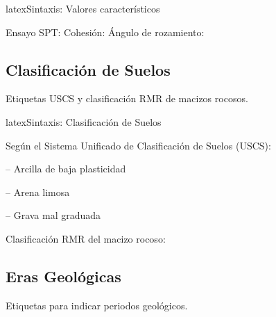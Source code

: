\begin{geotechdata}
\end{geotechdata}


\begin{codigosimple}{latex}{Sintaxis: Valores característicos}
      
\end{codigosimple}

\vspace{0.5em}
\noindent
Ensayo SPT:  \quad
Cohesión:  \quad
Ángulo de rozamiento: 

\subsection{Clasificación de Suelos}
\label{subsec:clasificacion-suelos}

Etiquetas USCS y clasificación RMR de macizos rocosos.

\begin{codigosimple}{latex}{Sintaxis: Clasificación de Suelos}
\end{codigosimple}

\noindent
Según el Sistema Unificado de Clasificación de Suelos (USCS):

\noindent
{} -- Arcilla de baja plasticidad

\noindent
{} -- Arena limosa

\noindent
{} -- Grava mal graduada

\vspace{1em}
\noindent
Clasificación RMR del macizo rocoso: 

\subsection{Eras Geológicas}
\label{subsec:eras}

Etiquetas para indicar periodos geológicos.

